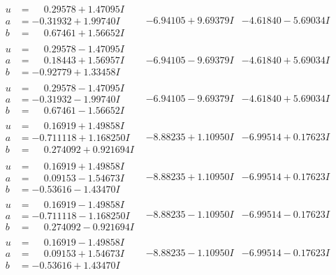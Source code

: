 \documentclass[1p]{elsarticle_modified}
\theoremstyle{definition}
\begin{document}
$$\begin{array}{c|c|c}
\begin{aligned}
u &= \phantom{-}0.29578 + 1.47095 I \\
a &= -0.31932 + 1.99740 I \\
b &= \phantom{-}0.67461 + 1.56652 I\end{aligned}
 & -6.94105 + 9.69379 I & -4.61840 - 5.69034 I \\ \hline\begin{aligned}
u &= \phantom{-}0.29578 - 1.47095 I \\
a &= \phantom{-}0.18443 + 1.56957 I \\
b &= -0.92779 + 1.33458 I\end{aligned}
 & -6.94105 - 9.69379 I & -4.61840 + 5.69034 I \\ \hline\begin{aligned}
u &= \phantom{-}0.29578 - 1.47095 I \\
a &= -0.31932 - 1.99740 I \\
b &= \phantom{-}0.67461 - 1.56652 I\end{aligned}
 & -6.94105 - 9.69379 I & -4.61840 + 5.69034 I \\ \hline\begin{aligned}
u &= \phantom{-}0.16919 + 1.49858 I \\
a &= -0.711118 + 1.168250 I \\
b &= \phantom{-}0.274092 + 0.921694 I\end{aligned}
 & -8.88235 + 1.10950 I & -6.99514 + 0.17623 I \\ \hline\begin{aligned}
u &= \phantom{-}0.16919 + 1.49858 I \\
a &= \phantom{-}0.09153 - 1.54673 I \\
b &= -0.53616 - 1.43470 I\end{aligned}
 & -8.88235 + 1.10950 I & -6.99514 + 0.17623 I \\ \hline\begin{aligned}
u &= \phantom{-}0.16919 - 1.49858 I \\
a &= -0.711118 - 1.168250 I \\
b &= \phantom{-}0.274092 - 0.921694 I\end{aligned}
 & -8.88235 - 1.10950 I & -6.99514 - 0.17623 I \\ \hline\begin{aligned}
u &= \phantom{-}0.16919 - 1.49858 I \\
a &= \phantom{-}0.09153 + 1.54673 I \\
b &= -0.53616 + 1.43470 I\end{aligned}
 & -8.88235 - 1.10950 I & -6.99514 - 0.17623 I \\ \hline\begin{aligned}

\end{aligned}
\end{array}$$
\end{document}
